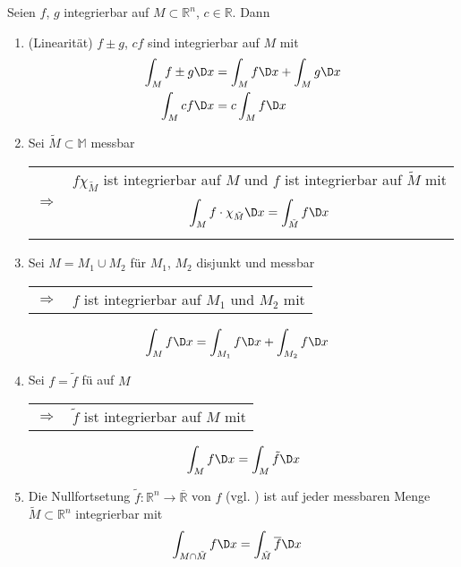 \begin{proposition}[Rechenregeln]
	Seien $f$, $g$ integrierbar auf $M\subset\mathbb{R}^n$, $c\in\mathbb{R}$. Dann
	\begin{enumerate}[label={\alph*)}]
		\item {}
		(Linearität) $f\pm g$, $cf$ sind integrierbar auf $M$ mit \begin{align*}
			\int_M f \pm g \D x &= \int_M f\D x + \int_M g \D x \\
			\int_M c f \D x &= c \int_M f \D x
		\end{align*}
		\item {}
		Sei $\tilde{M}\subset\mathbb{M}$ messbar\\
		\begin{tabularx}{\linewidth}{r@{\ \ }X}
			$\Rightarrow$ & $f \chi_{\tilde{M}}$ ist integrierbar auf $M$ und $f$ ist integrierbar auf $\tilde{M}$ mit \[
				\int_M f\cdot \chi_{\tilde{M}} \D x = \int_{\tilde{M}} f \D x \]
		\end{tabularx}
		\item{}
		Sei $M = M_1\cup M_2$ für $M_1$, $M_2$ disjunkt und messbar \\
		\begin{tabularx}{\linewidth}{r@{\ \ }X}
			$\Rightarrow$ & $f$ ist integrierbar auf $M_1$ und $M_2$ mit 
		\end{tabularx}
		\begin{align*}
			\int_M f \D x &= \int_{M_1}  f \D x + \int_{M_2} f \D x
		\end{align*}
		\item{}
		Sei $f = \tilde{f}$ \gls{fü} auf $M$ \\\begin{tabularx}{\linewidth}{r@{\ \ }X}
			$\Rightarrow$ & $\tilde{f}$ ist integrierbar auf $M$ mit
		\end{tabularx}
		\begin{align*}
			\int_M f \D x = \int_M \tilde{f} \D x
		\end{align*}
		\item{}
		Die Nullfortsetung $\tilde{f}:\mathbb{R}^n\to\overline{\mathbb{R}}$ von $f$ (vgl. ) ist auf jeder messbaren Menge $\tilde{M}\subset\mathbb{R}^n$ integrierbar mit \begin{align*}
			\int_{M\cap \tilde{M}} f \D x &= \int_{\tilde{M}} \overline{f}\D x
		\end{align*}
	\end{enumerate}
\end{proposition}


